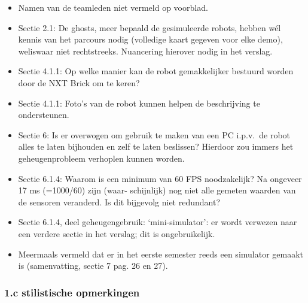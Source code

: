 \documentclass[12pt,a4paper]{report}
\begin{document}
 
\begin{itemize}
 \item Namen van de teamleden niet vermeld op voorblad.
 \item Sectie 2.1: De ghosts, meer bepaald de gesimuleerde robots, hebben w\'el kennis van het parcours nodig (volledige
kaart gegeven voor elke demo), weliswaar niet rechtstreeks. Nuancering hierover nodig in het verslag.
 \item Sectie 4.1.1: Op welke manier kan de robot gemakkelijker bestuurd worden door de NXT Brick om te keren?
 \item Sectie 4.1.1: Foto's van de robot kunnen helpen de beschrijving te ondersteunen.
 \item Sectie 6: Is er overwogen om gebruik te maken van een PC i.p.v.\ de robot alles te laten bijhouden en zelf te
laten beslissen? Hierdoor zou immers het geheugenprobleem verhoplen kunnen worden.
 \item Sectie 6.1.4: Waarom is een minimum van 60 FPS noodzakelijk? Na ongeveer 17 ms (=1000/60) zijn (waar-
schijnlijk) nog niet alle gemeten waarden van de sensoren veranderd. Is dit bijgevolg niet redundant?
\item Sectie 6.1.4, deel geheugengebruik: `mini-simulator': er wordt verwezen naar een verdere sectie in het verslag;
dit is ongebruikelijk.
\item Meermaals vermeld dat er in het eerste semester reeds een simulator gemaakt is (samenvatting, sectie 7 pag. 26
en 27).
\end{itemize}

   \subsubsection{1.c stilistische opmerkingen}
\end{document}
